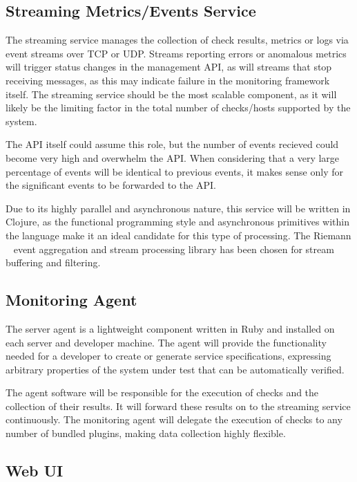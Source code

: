 \documentclass{cshonours}
\begin{document}
\subsection{Streaming Metrics/Events Service}

The streaming service manages the collection of check results, metrics or logs via event streams over TCP or UDP. Streams reporting errors or anomalous metrics will trigger status changes in the management API, as will streams that stop receiving messages, as this may indicate failure in the monitoring framework itself. The streaming service should be the most scalable component, as it will likely be the limiting factor in the total number of checks/hosts supported by the system.

The API itself could assume this role, but the number of events recieved could become very high and overwhelm the API. When considering that a very large percentage of events will be identical to previous events, it makes sense only for the significant events to be forwarded to the API.

Due to its highly parallel and asynchronous nature, this service will be written in Clojure, as the functional programming style and asynchronous primitives within the language make it an ideal candidate for this type of processing. The Riemann ~\cite{Riemann} event aggregation and stream processing library has been chosen for stream buffering and filtering.

\subsection{Monitoring Agent}

The server agent is a lightweight component written in Ruby and installed on each server and developer machine. The agent will provide the functionality needed for a developer to create or generate service specifications, expressing arbitrary properties of the system under test that can be automatically verified.

The agent software will be responsible for the execution of checks and the collection of their results. It will forward these results on to the streaming service continuously. The monitoring agent will delegate the execution of checks to any number of bundled plugins, making data collection highly flexible.

\subsection{Web UI}
\end{document}
